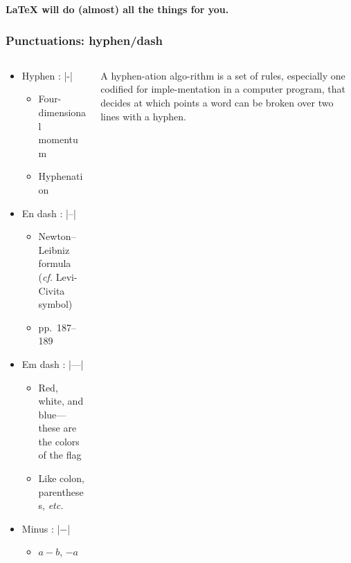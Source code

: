 \begin{frame}[standout]
  \large \textbf{\LaTeX{} will do (almost) all the things for you.}
\end{frame}

\begin{frame}[fragile]
\frametitle{Punctuations: hyphen/dash}
\begin{columns}
\begin{column}{0.84\textwidth}
  \begin{itemize}
    \item Hyphen : |-|
      \begin{itemize}
        \item Four-dimensional momentum
        \item Hyphenation
      \end{itemize}
    \item En dash : |--|
      \begin{itemize}
        \item Newton--Leibniz formula (\emph{cf.} Levi-Civita symbol)
        \item pp.~187--189
      \end{itemize}
    \item Em dash : |---|
      \begin{itemize}
        \item Red, white, and blue---these are the colors of the flag
        \item Like colon, parentheses, \emph{etc.}
      \end{itemize}
    \item Minus : |$-$|
      \begin{itemize}
        \item $a-b$, $-a$
      \end{itemize}
  \end{itemize}
\end{column}
\begin{column}{0.13\textwidth}
  \tiny\RaggedRight
  A hyphen\alert{-}ation algo\alert{-}rithm is a set of rules, especially one codified
  for imple\alert{-}mentation in a computer program, that decides at which points
  a word can be broken over two lines with a hyphen.
\end{column}
\end{columns}
\end{frame}

